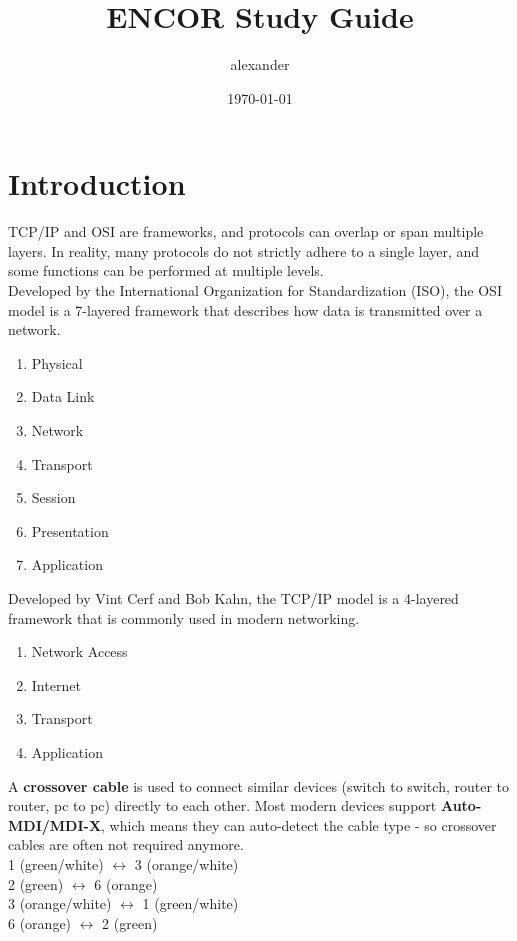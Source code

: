 \documentclass{article}
\title{ENCOR Study Guide}
\author{alexander}
\date{\today}
\begin{document}
\maketitle

\section*{Introduction}

TCP/IP and OSI are frameworks, and protocols can overlap or span multiple layers. In reality, many protocols do not strictly adhere to a single layer, and some functions can be performed at multiple levels.\\

Developed by the International Organization for Standardization (ISO), the OSI model is a 
7-layered framework that describes how data is transmitted over a network.	
	\begin{enumerate}
		\item Physical
		\item Data Link
		\item Network
		\item Transport
		\item Session
		\item Presentation
		\item Application
	\end{enumerate}

Developed by Vint Cerf and Bob Kahn, the TCP/IP model is a 4-layered framework that is commonly 
used in modern networking.
	\begin{enumerate}
		\item Network Access
		\item Internet
		\item Transport
		\item Application
	\end{enumerate}

A \textbf{crossover cable} is used to connect similar devices (switch to switch, router to router, pc to pc)  directly to each other. Most modern devices support \textbf{Auto-MDI/MDI-X}, which means they can auto-detect the cable type - so crossover cables are often not required anymore.\\

1 (green/white) $\leftrightarrow$ 3 (orange/white)\\
2 (green) $\leftrightarrow$ 6 (orange)\\
3 (orange/white) $\leftrightarrow$ 1 (green/white)\\
6 (orange) $\leftrightarrow$ 2 (green)\\
\end{document}
